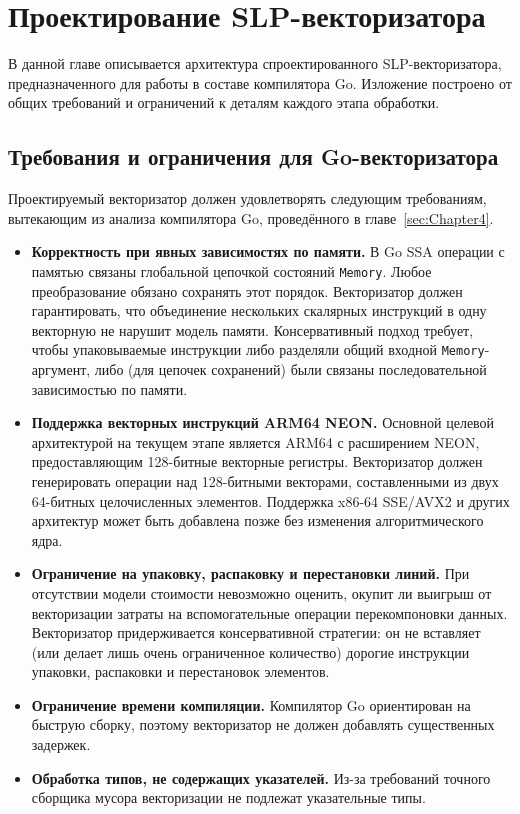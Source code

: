 \section{Проектирование SLP-векторизатора}
\label{sec:Chapter5} 

В данной главе описывается архитектура спроектированного SLP-векторизатора, предназначенного для работы в составе компилятора Go. 
Изложение построено от общих требований и ограничений к деталям каждого этапа обработки.

\subsection{Требования и ограничения для Go-векторизатора}
\label{sec:requirements}

Проектируемый векторизатор должен удовлетворять следующим требованиям, вытекающим из анализа компилятора Go,
проведённого в главе~\ref{sec:Chapter4}.

\begin{itemize}
    \item \textbf{Корректность при явных зависимостях по памяти.} В Go SSA операции с памятью связаны глобальной цепочкой состояний \texttt{Memory}.
    Любое преобразование обязано сохранять этот порядок. Векторизатор должен гарантировать, что объединение нескольких скалярных инструкций в одну векторную не нарушит модель памяти. 
    Консервативный подход требует, чтобы упаковываемые инструкции либо разделяли общий входной \texttt{Memory}-аргумент, либо (для цепочек сохранений) были связаны последовательной зависимостью по памяти.
    
    \item \textbf{Поддержка векторных инструкций ARM64 NEON.} Основной целевой архитектурой на текущем этапе является ARM64 
    с расширением NEON, предоставляющим 128-битные векторные регистры. 
    Векторизатор должен генерировать операции над 128-битными векторами, составленными из двух 64-битных целочисленных элементов.
    Поддержка x86-64 SSE/AVX2 и других архитектур может быть добавлена позже без изменения алгоритмического ядра.

    \item \textbf{Ограничение на упаковку, распаковку и перестановки линий.}
    При отсутствии модели стоимости невозможно оценить, окупит ли выигрыш от векторизации 
    затраты на вспомогательные операции перекомпоновки данных.
    Векторизатор придерживается консервативной стратегии: он не вставляет (или делает лишь очень ограниченное количество) 
    дорогие инструкции упаковки, распаковки и перестановок элементов.

    \item \textbf{Ограничение времени компиляции.} 
    Компилятор Go ориентирован на быструю сборку, поэтому векторизатор не должен добавлять существенных задержек.
    
    \item \textbf{Обработка типов, не содержащих указателей.} Из-за требований точного сборщика мусора 
    векторизации не подлежат указательные типы.
\end{itemize}

